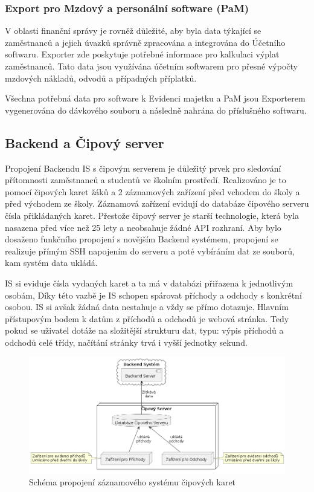 \documentclass[FM,Proj]{tulthesis}
\begin{document}
\subsubsection{Export pro Mzdový a personální software (PaM)} \label{section:export-pro-evidenci-pam}
V oblasti finanční správy je rovněž důležité, aby byla data týkající se zaměstnanců a jejich
úvazků správně zpracována a integrována do Účetního softwaru. Exporter zde poskytuje potřebné
informace pro kalkulaci výplat zaměstnanců. Tato data jsou využívána účetním softwarem pro 
přesné výpočty mzdových nákladů, odvodů a případných příplatků.

Všechna potřebná data pro software k Evidenci majetku a PaM jsou Exporterem vygenerována 
do dávkového souboru a následně nahrána do příslušného softwaru. 

\subsection{Backend a Čipový server}
\label{section:backend-a-cipovy-server}
Propojení Backendu IS s čipovým serverem je důležitý prvek pro sledování přítomnosti
zaměstnanců a studentů ve školním prostředí. Realizováno je to pomocí čipových karet žáků
a 2 záznamových zařízení před vchodem do školy a před východem ze školy. Záznamová zařízení
evidují do databáze čipového serveru čísla přikládaných karet. Přestože čipový 
server je starší technologie, která byla nasazena před více než 25 lety a neobsahuje 
žádné API rozhraní. Aby bylo dosaženo funkčního propojení s novějším Backend systémem,
propojení se realizuje přímým SSH napojením do serveru a poté vybíráním dat ze souborů,
kam systém data ukládá.

IS si eviduje čísla vydaných karet a ta má v databázi přiřazena k jednotlivým osobám,
Díky této vazbě je IS schopen spárovat příchody a odchody s konkrétní osobou. IS si avšak žádná
data nestahuje a vždy se přímo dotazuje. Hlavním přístupovým bodem k datům z příchodů 
a odchodů je webová stránka. Tedy pokud se uživatel dotáže na složitější strukturu dat, typu:
výpis příchodů a odchodů celé třídy, načítání stránky trvá i vyšší jednotky sekund.

\begin{figure}[H]
    \includegraphics[width=\textwidth-28pt]{backend-cipovy-server.png}
    \caption{Schéma propojení záznamového systému čipových karet}
    \label{fig:backend-cipovy-server}
\end{figure}
\end{document}
